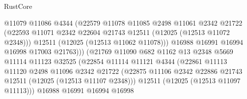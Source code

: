 \begin{lexlean}{RustCore}
\begin{coremodule}
                                    @11079
                                    @11086
                                    @4344
                                    (@22579
                                      @11078
                                      @11085
                                      @2498
                                      @11061
                                      @2342
                                      @21722
                                      (@22593
                                        @11071
                                        @2342
                                        @22604
                                        @21743
                                        @12511
                                        (@12025 (@12513 @11072 @2348)))
                                      @12511
                                      (@12025 (@12513 @11062 @11078)))
                                    @16988
                                    @16991
                                    @16994
                                    @16998
                                    @17003
                                    @21763)))
                              (@21769
                                @11090
                                @682
                                @1162
                                @13
                                @2348
                                @5669
                                @11114
                                @11123
                                @32525
                                (@22854
                                  @11114
                                  @11121
                                  @4344
                                  (@22861
                                    @11113
                                    @11120
                                    @2498
                                    @11096
                                    @2342
                                    @21722
                                    (@22875
                                      @11106
                                      @2342
                                      @22886
                                      @21743
                                      @12511
                                      (@12025 (@12513 @11107 @2348)))
                                    @12511
                                    (@12025 (@12513 @11097 @11113)))
                                  @16988
                                  @16991
                                  @16994
                                  @16998

\end{coremodule}
\end{lexlean}
